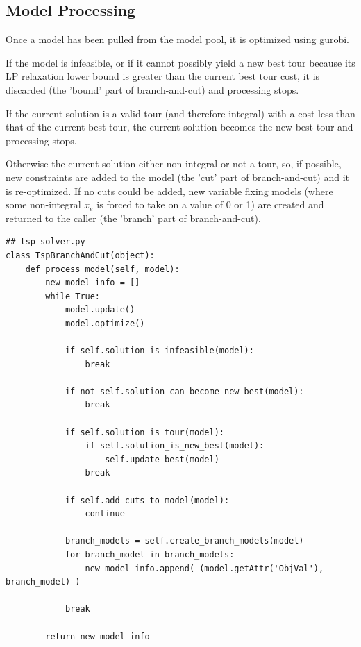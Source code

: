 \documentclass{article}
\begin{document}
\subsection{Model Processing}
\begin{flushleft}

Once a model has been pulled
from the model pool,
it is optimized using gurobi.

If the model is infeasible,
or if it cannot possibly yield a new best tour
because its LP relaxation lower bound
is greater than the current best tour cost,
it is discarded
(the 'bound' part of branch-and-cut)
and processing stops.

If the current solution
is a valid tour
(and therefore integral)
with a cost less than that
of the current best tour,
the current solution becomes the new best tour
and processing stops.

Otherwise the current solution
either non-integral or not a tour,
so, if possible, new constraints
are added to the model
(the 'cut' part of branch-and-cut)
and it is re-optimized.
If no cuts could be added,
new variable fixing models
(where some non-integral $x_e$
is forced to take on a value of 0 or 1)
are created
and returned to the caller
(the 'branch' part of branch-and-cut).

\begin{lstlisting}
## tsp_solver.py
class TspBranchAndCut(object):
    def process_model(self, model):
        new_model_info = []
        while True:
            model.update()
            model.optimize()

            if self.solution_is_infeasible(model):
                break

            if not self.solution_can_become_new_best(model):
                break

            if self.solution_is_tour(model):
                if self.solution_is_new_best(model):
                    self.update_best(model)
                break

            if self.add_cuts_to_model(model):
                continue

            branch_models = self.create_branch_models(model)
            for branch_model in branch_models:
                new_model_info.append( (model.getAttr('ObjVal'), branch_model) )

            break

        return new_model_info
\end{lstlisting}
\end{flushleft}
\end{document}
